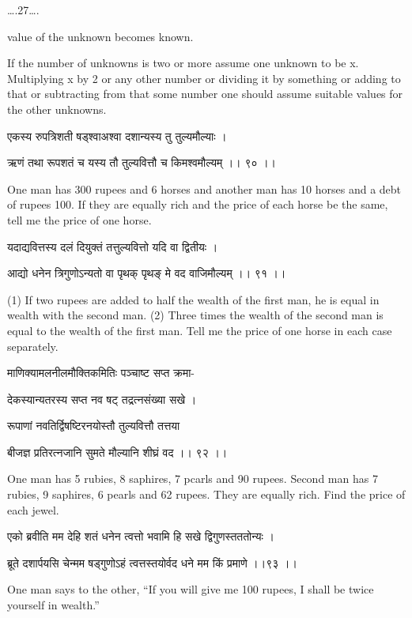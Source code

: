 \documentclass[]{article}
\date{}
\begin{document}
{\ldots{}.27\ldots{}.}

{value of the unknown becomes known.}

{If the number of unknowns is two or more assume one unknown to be x.
Multiplying x by 2 or any other number or dividing it by something or
adding to that or subtracting from that some number one should assume
suitable values for the other unknowns.}

{एकस्य रुपत्रिशती षड्श्वाअश्वा दशान्यस्य तु तुल्यमौल्याः । }

{ऋणं तथा रूपशतं च यस्य तौ तुल्यवित्तौ च किमश्वमौल्यम् ।। ९० ।।}

{ One man has 300 rupees and 6 horses and another man has 10 horses and
a debt of rupees 100. If they are equally rich and the price of each
horse be the same, tell me the price of one horse.}

{यदाद्यवित्तस्य दलं दियुक्तं तत्तुल्यवित्तो यदि वा द्वितीयः । }

{आद्यो धनेन त्रिगुणोऽन्यतो वा पृथक् पृथङ् मे वद वाजिमौल्यम् ।। ९१ ।। }

{(1) If two rupees are added to half the wealth of the first man, he is
equal in wealth with the second man. (2) Three times the wealth of the
second man is equal to the wealth of the first man. Tell me the price of
one horse in each case separately.}

{माणिक्यामलनीलमौक्तिकमितिः पञ्चाष्ट सप्त क्रमा- }

{देकस्यान्यतरस्य सप्त नव षट् तद्रत्नसंख्या सखे । }

{रूपाणां नवतिर्द्विषष्टिरनयोस्तौ तुल्यवित्तौ त}{त्तया}{ }

{बीजज्ञ प्रतिरत्नजानि सुमते मौल्यानि शीघ्रं वद ।। ९२ ।। }

{One man has 5 rubies, 8 saphires, 7 pcarls and 90 rupees. Second man
has 7 rubies, 9 saphires, 6 pearls and 62 rupees. They are equally rich.
Find the price of each jewel.}

{एको ब्रवीति मम देहि शतं धनेन त्वत्तो भवामि हि सखे द्विगुणस्तततोन्यः । }

{ब्रूते दशार्पयसि चेन्मम षड्गुणोऽहं त्वत्तस्तयोर्वद धने मम किं प्रमाणे
।।९३ ।। }

{One man says to the other, ``If you will give me 100 rupees, I shall be
twice yourself in wealth.''\\
}
\end{document}
